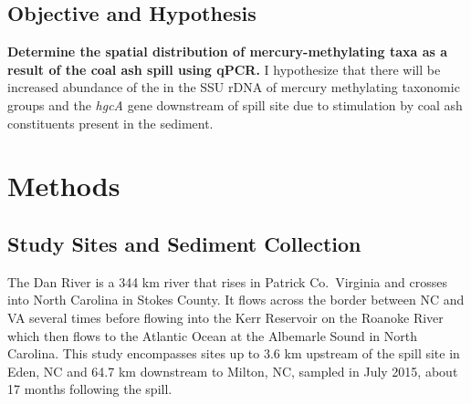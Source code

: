 \documentclass[ms, hidelinks]{uncgdissertationexp}
\theoremstyle{plain}
\theoremstyle{definition}
\theoremstyle{remark}
\begin{document}
\hypertarget{objective-and-hypothesis}{%
\subsection{Objective and Hypothesis}\label{objective-and-hypothesis}}

\textbf{Determine the spatial distribution of mercury-methylating taxa as a result of the coal ash spill using qPCR.}
I hypothesize that there will be increased abundance of the in the SSU rDNA of mercury methylating taxonomic groups and the \emph{hgcA} gene downstream of spill site due to stimulation by coal ash constituents present in the sediment.

\hypertarget{methods}{%
\section{Methods}\label{methods}}

\hypertarget{study-sites-and-sediment-collection}{%
\subsection{Study Sites and Sediment Collection}\label{study-sites-and-sediment-collection}}

The Dan River is a 344 km river that rises in Patrick Co.~Virginia and crosses into North Carolina in Stokes County. It flows across the border between NC and VA several times before flowing into the Kerr Reservoir on the Roanoke River which then flows to the Atlantic Ocean at the Albemarle Sound in North Carolina. This study encompasses sites up to 3.6 km upstream of the spill site in Eden, NC and 64.7 km downstream to Milton, NC, sampled in July 2015, about 17 months following the spill.
\end{document}
